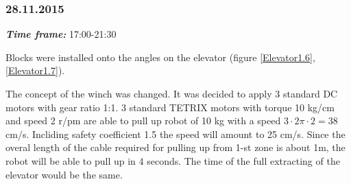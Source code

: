 \subsubsection{28.11.2015}
\textit{\textbf{Time frame:}} 17:00-21:30

Blocks were installed onto the angles on the elevator (figure \ref{Elevator1.6}, \ref{Elevator1.7}).

The concept of the winch was changed. It was decided to apply 3 standard DC motors with gear ratio 1:1. 3 standard TETRIX motors with torque 10 kg/cm and speed 2 r/pm are able to pull up robot of 10 kg with a speed $3 \cdot 2\pi \cdot 2 = 38$ cm/s. Incliding safety coefficient 1.5 the speed will amount to 25 cm/s. Since the overal length of the cable required for pulling up from 1-st zone is about 1m, the robot will be able to pull up in 4 seconds. The time of the full extracting of the elevator would be the same.

